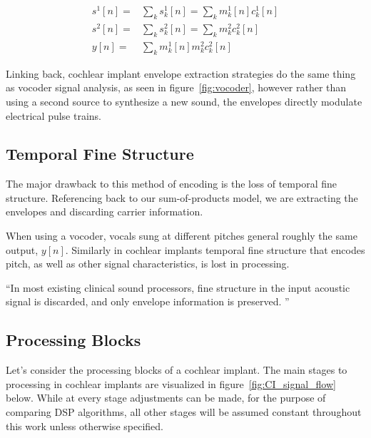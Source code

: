 \documentclass [11pt, proquest,oneside] {ganter_thesis}[2015/03/03]
\begin{document}
\begin{align}
\label{eq:sum-of-products}
s^1[n] =& \sum\limits_k s_k^1[n] = \sum\limits_k m^1_k[n] c^1_k[n] \\
s^2[n] =& \sum\limits_k s_k^2[n] = \sum\limits_k m^2_k c^2_k[n] \\
y[n] =& \sum\limits_k m_k^1[n] m^2_k c^2_k[n]
\end{align}

Linking back, cochlear implant envelope extraction strategies do the same thing as vocoder signal analysis, as seen in figure~\ref{fig:vocoder}, however rather than using a second source to synthesize a new sound, the envelopes directly modulate electrical pulse trains.

\subsection{Temporal Fine Structure}

The major drawback to this method of encoding is the loss of temporal fine structure.  Referencing back to our sum-of-products model, we are extracting the envelopes and discarding carrier information.

When using a vocoder, vocals sung at different pitches general roughly the same output, $y[n]$.  Similarly in cochlear implants temporal fine structure that encodes pitch, as well as other signal characteristics, is lost in processing.

``In most existing clinical sound processors, fine structure in the input acoustic signal is discarded, and only envelope information is preserved. ''  %


\subsection{Processing Blocks}

Let's consider the processing blocks of a cochlear implant.  The main stages to processing in cochlear implants are visualized in figure~\ref{fig:CI_signal_flow} below.  While at every stage adjustments can be made, for the purpose of comparing DSP algorithms, all other stages will be assumed constant throughout this work unless otherwise specified.
\end{document}
